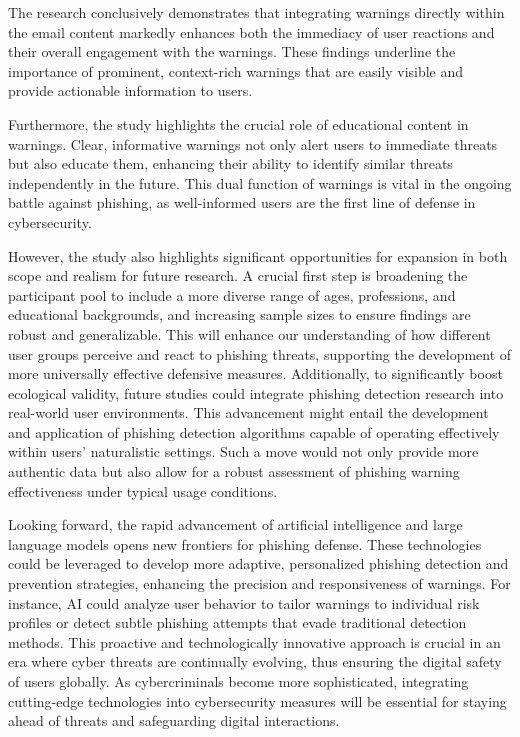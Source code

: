 \documentclass[
  a4paper,  %
  twoside,  %
  bibliography=totoc,
  headsepline,
  cleardoublepage=empty,
  parskip=half,
  draft=false
]{scrbook}
\begin{document}
The research conclusively demonstrates that integrating warnings directly within the email content markedly enhances both the immediacy of user reactions and their overall engagement with the warnings. These findings underline the importance of prominent, context-rich warnings that are easily visible and provide actionable information to users.

Furthermore, the study highlights the crucial role of educational content in warnings. Clear, informative warnings not only alert users to immediate threats but also educate them, enhancing their ability to identify similar threats independently in the future. This dual function of warnings is vital in the ongoing battle against phishing, as well-informed users are the first line of defense in cybersecurity.

However, the study also highlights significant opportunities for expansion in both scope and realism for future research. A crucial first step is broadening the participant pool to include a more diverse range of ages, professions, and educational backgrounds, and increasing sample sizes to ensure findings are robust and generalizable. This will enhance our understanding of how different user groups perceive and react to phishing threats, supporting the development of more universally effective defensive measures. Additionally, to significantly boost ecological validity, future studies could integrate phishing detection research into real-world user environments. This advancement might entail the development and application of phishing detection algorithms capable of operating effectively within users' naturalistic settings. Such a move would not only provide more authentic data but also allow for a robust assessment of phishing warning effectiveness under typical usage conditions.

Looking forward, the rapid advancement of artificial intelligence and large language models opens new frontiers for phishing defense. These technologies could be leveraged to develop more adaptive, personalized phishing detection and prevention strategies, enhancing the precision and responsiveness of warnings. For instance, AI could analyze user behavior to tailor warnings to individual risk profiles or detect subtle phishing attempts that evade traditional detection methods. This proactive and technologically innovative approach is crucial in an era where cyber threats are continually evolving, thus ensuring the digital safety of users globally. As cybercriminals become more sophisticated, integrating cutting-edge technologies into cybersecurity measures will be essential for staying ahead of threats and safeguarding digital interactions.
\end{document}

